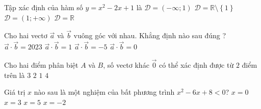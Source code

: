 \begin{ex}%
	Tập xác định của hàm số $y=x^2-2x+1$ là
	\choice
	{$\mathscr{D}=(-\infty;1)$}
	{$\mathscr{D}=\mathbb{R}\setminus\left\{ 1\right\}$}
	{$\mathscr{D}=(1;+\infty)$}
	{\True $\mathscr{D}=\mathbb{R}$}
\end{ex}
\begin{ex}%
	Cho hai vectơ $\overrightarrow{a}$ và $\overrightarrow{b}$ vuông góc với nhau. Khẳng định nào sau đúng ?
	\choice
	{$\overrightarrow{a}\cdot \overrightarrow{b}=2023$}
	{$\overrightarrow{a}\cdot \overrightarrow{b}=1$}
	{$\overrightarrow{a}\cdot \overrightarrow{b}=-5$}
	{\True $\overrightarrow{a}\cdot\overrightarrow{b}=0$}

\end{ex}
\begin{ex}%
	Cho hai điểm phân biệt $A$ và $B$, số vectơ khác $\overrightarrow{0}$ có thể xác định được từ $2$ điểm trên là
	\choice
	{$3$}
	{\True$2$}
	{$1$}
	{$4$}
\end{ex}
\begin{ex}%
	Giá trị $x$ nào sau là một nghiệm của bất phương trình $x^2-6x+8<0$?
	\choice
	{$x=0$}
	{\True$x=3$}
	{$x=5$}
	{$x=-2$}
\end{ex}

